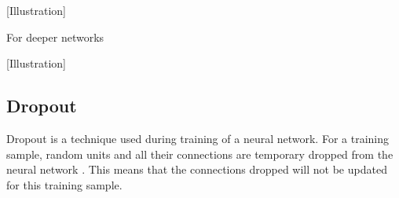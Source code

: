 [Illustration]

For deeper networks

[Illustration]

\subsection{Dropout}
\label{dead-neurons}
% 

Dropout is a technique used during training of a neural network. For a training sample, random units and all their connections are temporary dropped from the neural network \parencite{srivastava_dropout:_2014}. This means that the connections dropped will not be updated for this training sample. 


